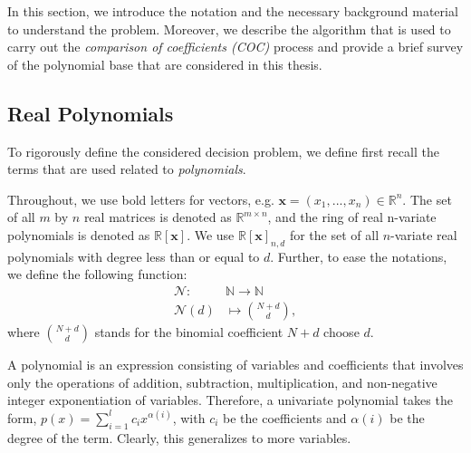\documentclass[12pt]{amsart}
\numberwithin{equation}{section}
\theoremstyle{definition}
\numberwithin{thm}{section}
\begin{document}
In this section, we introduce the notation and the necessary background material
to understand the problem. 
Moreover, we describe the algorithm that is used to carry out the \emph{comparison of coefficients (COC)}
process and provide a brief survey of the polynomial base that are considered in this thesis.


\subsection{Real Polynomials}
\label{Sec:Real Polynomials}
To rigorously define the considered decision problem,
we define first recall the terms that are used related to \emph{polynomials}.

Throughout, we use bold letters for vectors, e.g. $\mathbf{x} = (x_1, ..., x_n) \in \mathbb{R}^n$.
The set of all $m$ by $n$ real matrices is denoted as $\mathbb{R}^{m \times n}$, and the ring of real n-variate polynomials is denoted as $\mathbb{R}[\mathbf{x}]$. 
We use $\mathbb{R}[\mathbf{x}]_{n, d}$ for the set of all $n$-variate real polynomials with degree less than or equal to $d$.
Further, to ease the notations, we define the following function: 
\begin{equation*}
     \begin{split}
          \mathcal{N}: & \mathbb{N} \to \mathbb{N} \\
          \mathcal{N}(d) & \mapsto { N+d \choose d },
     \end{split}
\end{equation*}
where ${ N+d \choose d }$ stands for the binomial coefficient $N+d$ choose $d$. 

A polynomial is an expression consisting of variables and coefficients that involves only the operations of addition, subtraction, multiplication, and non-negative integer exponentiation of variables.
Therefore, a univariate polynomial takes the form, $p(x) = \sum_{i = 1} ^{l} c_i x^{\alpha(i)}$, with $c_i$ be the coefficients and $\alpha(i)$ be the degree of the term. 
Clearly, this generalizes to more variables.
\end{document}
